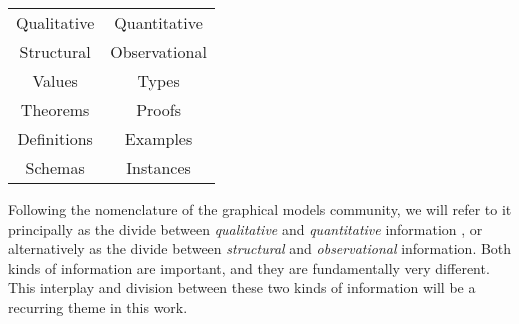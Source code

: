 \begin{center}
    \begin{tabular}{c|c}
        Qualitative & Quantitative \\ 
        Structural & Observational \\
            \hline
        Values & Types \\ 
        Theorems & Proofs \\
        Definitions & Examples \\
        Schemas & Instances 
    \end{tabular}
    \end{center}
    
Following the nomenclature of the graphical models community, we will refer to it principally as the divide between \emph{qualitative} and \emph{quantitative} information 
\unskip, or alternatively as the divide between \emph{structural} and \emph{observational} information.
%
Both kinds of information are important, and they are fundamentally very different.
This interplay and division between these two kinds of information will be a recurring theme in this work.




